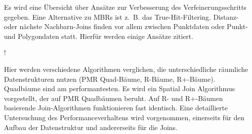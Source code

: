 \documentclass[a4paper,12pt,twoside]{article}
\begin{document}
Es wird eine Übersicht über Ansätze zur Verbesserung des Verfeinerungsschritts gegeben. Eine Alternative zu MBRs  ist z.~B. das True-Hit-Filtering. Distanz- oder nächste Nachbarn-Joins finden vor allem zwischen Punktdaten oder Punkt- und Polygondaten statt. Hierfür werden einige Ansätze zitiert.

\textbf{}!

Hier werden verschiedene Algorithmen verglichen, die unterschiedliche räumliche Datenstrukturen nutzen (PMR Quad-Bäume, R-Bäume, R+-Bäume). Quadbäume sind am performantesten. Es wird ein Spatial Join Algorithmus vorgestellt, der auf PMR Quadbäumen beruht. Auf R- und R+-Bäumen basierende Join-Algorithmen funktionieren fast identisch. Eine detaillierte Untersuchung des Performanceverhaltens wird vorgenommen, einerseits für den Aufbau der Datenstruktur und andererseits für die Joins.

\end{document}
